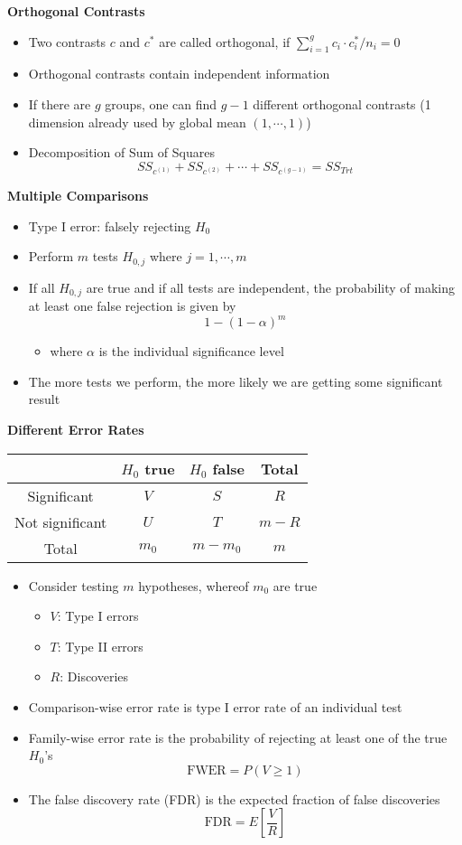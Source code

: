 \documentclass[a4paper]{article}
\begin{document}
\textbf{Orthogonal Contrasts}
\begin{itemize}
    \item Two contrasts $c$ and $c^*$ are called orthogonal, if $\sum_{i=1}^g c_i\cdot c_i^* / n_i=0$
    \item Orthogonal contrasts contain independent information
    \item If there are $g$ groups, one can find $g-1$ different orthogonal contrasts (1 dimension already used by global mean $(1,\cdots,1)$)
    \item Decomposition of Sum of Squares
    \[SS_{c^{(1)}}+SS_{c^{(2)}}+\cdots+SS_{c^{(g-1)}}=SS_{Trt} \]
\end{itemize}

\textbf{Multiple Comparisons}
\begin{itemize}
    \item Type I error: falsely rejecting $H_0$
    \item Perform $m$ tests $H_{0,j}$ where $j=1,\cdots,m$
    \item If all $H_{0,j}$ are true and if all tests are independent, the probability of making at least one false rejection is given by
    \[1-(1-\alpha)^m \]
    \begin{itemize}
        \item where $\alpha$ is the individual significance level
    \end{itemize}
    \item The more tests we perform, the more likely we are getting some significant result
\end{itemize}

\textbf{Different Error Rates}
\begin{table}[!htbp]
    \centering
    \begin{tabular}{c|c|c|c}
         & $H_0$ true & $H_0$ false & Total \\
    \hline
    Significant & $V$ & $S$ & $R$ \\
    \hline
    Not significant & $U$ & $T$ & $m-R$ \\
    \hline
    Total & $m_0$ & $m-m_0$ & $m$
    \end{tabular}
\end{table}
\begin{itemize}
    \item Consider testing $m$ hypotheses, whereof $m_0$ are true
    \begin{itemize}
        \item $V$: Type I errors
        \item $T$: Type II errors
        \item $R$: Discoveries
    \end{itemize}
    \item Comparison-wise error rate is type I error rate of an individual test
    \item Family-wise error rate is the probability of rejecting at least one of the true $H_0$'s
    \[\textrm{FWER}=P(V\geq 1) \]
    \item The false discovery rate (FDR) is the expected fraction of false discoveries
    \[\textrm{FDR}=E\left[\frac{V}{R} \right] \]
\end{itemize}
\end{document}
